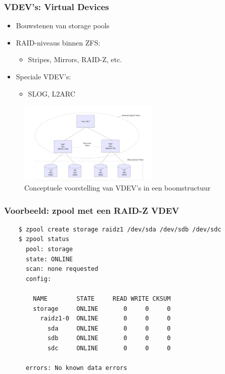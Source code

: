 \documentclass{beamer}
\begin{document}

\begin{frame}
  \frametitle{VDEV's: Virtual Devices}
  \begin{itemize}
    \item Bouwstenen van storage pools
    \item RAID-niveaus binnen ZFS:
    \begin{itemize}
      \item Stripes, Mirrors, RAID-Z, etc. 
    \end{itemize}
    \item Speciale VDEV's:
    \begin{itemize}
      \item SLOG, L2ARC
    \end{itemize}
  \end{itemize}
  \begin{figure}
    \centering
    \includegraphics[width=0.6\textwidth]{img/h6_vdevs_tree}
    \caption{Conceptuele voorstelling van VDEV's in een boomstructuur \autocite{Microsystems2006}}
    \label{fig:vdevs_boom}
  \end{figure}
\end{frame}


\begin{frame}[fragile]
  \frametitle{Voorbeeld: zpool met een RAID-Z VDEV}
  \begin{verbatim}
    $ zpool create storage raidz1 /dev/sda /dev/sdb /dev/sdc
    $ zpool status
      pool: storage
      state: ONLINE
      scan: none requested
      config:

	    NAME        STATE     READ WRITE CKSUM
	    storage     ONLINE       0     0     0
	      raidz1-0  ONLINE       0     0     0
	        sda     ONLINE       0     0     0
	        sdb     ONLINE       0     0     0
	        sdc     ONLINE       0     0     0

      errors: No known data errors
  \end{verbatim}
\end{frame}
\end{document}
